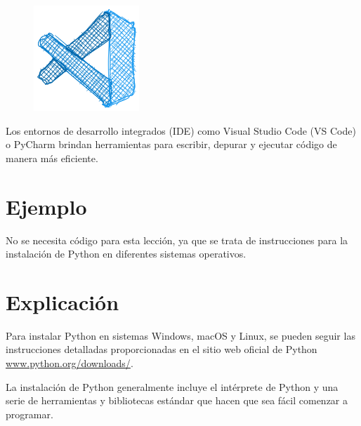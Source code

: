 \documentclass[
  a4paper,
  DIV=11,
  numbers=noendperiod,
  onepage,
  openany]{scrreprt}
\begin{document}
\begin{figure}

{\centering \includegraphics[width=1.5625in,height=\textheight]{unidades/unidad1/images/vscode.png}

}

\end{figure}

Los entornos de desarrollo integrados (IDE) como Visual Studio Code (VS
Code) o PyCharm brindan herramientas para escribir, depurar y ejecutar
código de manera más eficiente.

\section{Ejemplo}\label{ejemplo-1}

No se necesita código para esta lección, ya que se trata de
instrucciones para la instalación de Python en diferentes sistemas
operativos.

\section{Explicación}\label{explicaciuxf3n-1}

Para instalar Python en sistemas Windows, macOS y Linux, se pueden
seguir las instrucciones detalladas proporcionadas en el sitio web
oficial de Python
\href{https://www.python.org/downloads/}{www.python.org/downloads/}.

La instalación de Python generalmente incluye el intérprete de Python y
una serie de herramientas y bibliotecas estándar que hacen que sea fácil
comenzar a programar.
\end{document}
